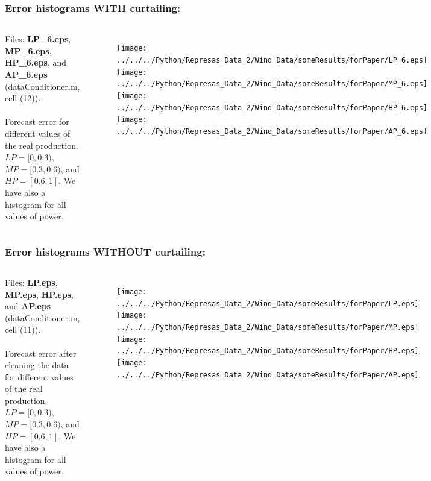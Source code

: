 \documentclass[aspectratio=169]{beamer}\usepackage[utf8]{inputenc}
\begin{document}

\begin{frame}\frametitle{Error histograms WITH curtailing:}

\begin{columns}

Files: \textbf{LP\_6.eps}, \textbf{MP\_6.eps}, \textbf{HP\_6.eps}, and \textbf{AP\_6.eps} (dataConditioner.m, cell (12)).\\
\quad\\
Forecast error for different values of the real production. $LP=[0,0.3)$, $MP=[0.3,0.6)$, and $HP=[0.6,1]$. We have also a histogram for all values of power.

\begin{figure}[ht!]
\centering
\texttt{[image: ../../../Python/Represas\_Data\_2/Wind\_Data/someResults/forPaper/LP\_6.eps]}
\texttt{[image: ../../../Python/Represas\_Data\_2/Wind\_Data/someResults/forPaper/MP\_6.eps]}
\texttt{[image: ../../../Python/Represas\_Data\_2/Wind\_Data/someResults/forPaper/HP\_6.eps]}\texttt{[image: ../../../Python/Represas\_Data\_2/Wind\_Data/someResults/forPaper/AP\_6.eps]}
\end{figure}

\end{columns}

\end{frame}


\begin{frame}\frametitle{Error histograms WITHOUT curtailing:}

\begin{columns}

Files: \textbf{LP.eps}, \textbf{MP.eps}, \textbf{HP.eps}, and \textbf{AP.eps} (dataConditioner.m, cell (11)).\\
\quad\\
Forecast error after cleaning the data for different values of the real production. $LP=[0,0.3)$, $MP=[0.3,0.6)$, and $HP=[0.6,1]$. We have also a histogram for all values of power.

\begin{figure}[ht!]
\centering
\texttt{[image: ../../../Python/Represas\_Data\_2/Wind\_Data/someResults/forPaper/LP.eps]}
\texttt{[image: ../../../Python/Represas\_Data\_2/Wind\_Data/someResults/forPaper/MP.eps]}
\texttt{[image: ../../../Python/Represas\_Data\_2/Wind\_Data/someResults/forPaper/HP.eps]}\texttt{[image: ../../../Python/Represas\_Data\_2/Wind\_Data/someResults/forPaper/AP.eps]}
\end{figure}

\end{columns}

\end{frame}
\end{document}
